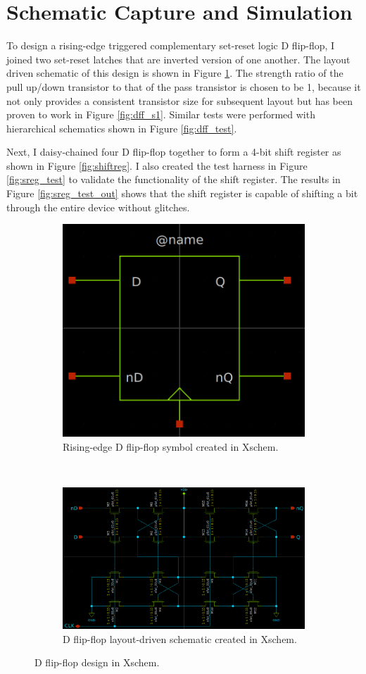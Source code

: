 \documentclass[11pt]{article}
\begin{document}
\section{Schematic Capture and Simulation}
    To design a rising-edge triggered complementary set-reset logic D flip-flop, I joined two set-reset latches that are inverted version of one another. The layout driven schematic of this design is shown in Figure \ref{fig:dff}. The strength ratio of the pull up/down transistor to that of the pass transistor is chosen to be 1, because it not only provides a consistent transistor size for subsequent layout but has been proven to work in Figure \ref{fig:dff_s1}. Similar tests were performed with hierarchical schematics shown in Figure \ref{fig:dff_test}. 

    Next, I daisy-chained four D flip-flop together to form a 4-bit shift register as shown in Figure \ref{fig:shiftreg}. I also created the test harness in Figure \ref{fig:sreg_test} to validate the functionality of the shift register. The results in Figure \ref{fig:sreg_test_out} shows that the shift register is capable of shifting a bit through the entire device without glitches.
    \begin{figure}[!ht]
        \centering
        \begin{subfigure}{\linewidth}
            \centering
            \includegraphics[width=0.2\linewidth]{../img/dff_sym.png}
            \caption{Rising-edge D flip-flop symbol created in Xschem.}
        \end{subfigure}\\
        \begin{subfigure}{0.8\linewidth}
            \includegraphics[width=\linewidth]{../img/dff_sch.png}
            \caption{D flip-flop layout-driven schematic created in Xschem.}
        \end{subfigure}
        \caption{D flip-flop design in Xschem.}
        \label{fig:dff}
    \end{figure}
\end{document}
